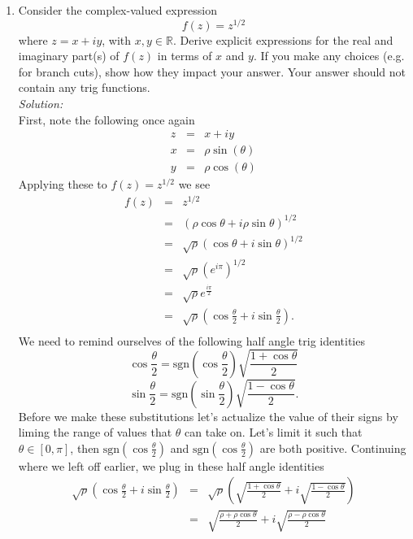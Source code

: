 \documentclass[10pt]{amsart}
\theoremstyle{nonumberplain}
\begin{document}
\begin{enumerate}[label={\bf {\arabic*}:}]
\item Consider the complex-valued expression
$$
f(z)=z^{1 / 2}
$$
where $z=x+i y$, with $x, y \in \mathbb{R}$. Derive explicit
expressions for the real and imaginary part(s) of $f(z)$ in terms of
$x$ and $y$. If you make any choices (e.g. for branch cuts), show how
they impact your answer. Your answer should not contain any trig
functions.\\
\textit{Solution:} \\
First, note the following once again
\begin{eqnarray*}
z &=& x +iy \\
x &=& \rho \sin(\theta) \\
y &=& \rho \cos(\theta)
\end{eqnarray*}
Applying these to $f(z)=z^{1 / 2}$ we see
\begin{eqnarray*}
f(z) &=& z^{1 / 2} \\
      &=& (\rho \cos \theta + i \rho \sin \theta)^{1 / 2} \\
      &=& \sqrt{\rho}(\cos \theta + i \sin \theta)^{1 / 2} \\
      &=& \sqrt{\rho}(e^{i \pi})^{1 / 2} \\
      &=& \sqrt{\rho}e^\frac{i \pi}{2} \\
      &=& \sqrt{\rho}\left(\cos \frac{\theta}{2} +i \sin\frac{\theta}{2}\right). \\
\end{eqnarray*}
We need to remind ourselves of the following half angle trig identities
$$ \cos \frac{\theta}{2} = \text{sgn} \left(\cos \frac{\theta}{2}\right) \sqrt{ \frac{ 1 + \cos \theta }{ 2 }} $$
$$ \sin \frac{\theta}{2} = \text{sgn} \left(\sin \frac{\theta}{2}\right) \sqrt{ \frac{ 1 - \cos \theta }{ 2 }}. $$
Before we make these substitutions let's actualize the value of their signs by liming the range of values that $\theta$ can take on.
Let's limit it such that $\theta \in [0, \pi]$, then $\text{sgn} \left(\cos \frac{\theta}{2}\right)$ and $\text{sgn} \left(\cos \frac{\theta}{2}\right)$ are both positive.
Continuing where we left off earlier, we plug in these half angle identities
\begin{eqnarray*}
\sqrt{\rho}\left(\cos \frac{\theta}{2} +i \sin\frac{\theta}{2}\right) &=& \sqrt{\rho}\left(\sqrt{ \frac{ 1 + \cos \theta }{ 2 }} +i \sqrt{ \frac{ 1 - \cos \theta }{ 2 }}\right) \\
      &=& \sqrt{ \frac{ \rho + \rho \cos \theta }{ 2 }} +i \sqrt{ \frac{ \rho - \rho \cos \theta }{ 2 }} \\

\end{eqnarray*}
\end{enumerate}
\end{document}

